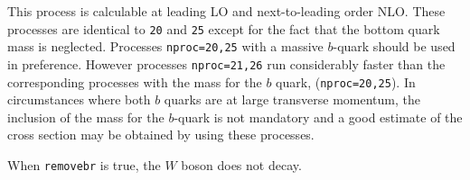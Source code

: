 \label{subsec:wbbmassless}

This process is calculable at leading LO and next-to-leading order NLO. 
These processes are identical to {\tt 20} and {\tt 25} except for the fact
that the bottom quark mass is neglected. 
Processes {\tt nproc=20,25} with a massive $b$-quark should be used in preference.
However processes {\tt nproc=21,26} run
considerably faster than the corresponding processes with the mass
for the $b$ quark, ({\tt nproc=20,25}). 
In circumstances where both $b$ quarks are at large
transverse momentum, the inclusion of the mass for the $b$-quark is not mandatory
and a good estimate of the cross section may be obtained by using these processes.

When {\tt removebr} is true, the $W$ boson does not decay.
